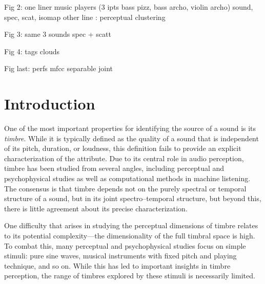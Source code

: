 \documentclass[10pt,letterpaper]{article}
\begin{document}
Fig 2: one liner music players (3 ipts bass pizz, bass archo, violin archo) sound, spec, scat, isomap
other line : perceptual clustering

Fig 3: same 3 sounds spec + scatt

Fig 4: tags clouds

Fig last: perfs mfcc separable joint


\section*{Introduction}
\label{sec:introduction}


One of the most important properties for identifying the source of a sound is its \emph{timbre}.
While it is typically defined as the quality of a sound that is independent of its pitch, duration, or loudness, this definition fails to provide an explicit characterization of the attribute.
Due to its central role in audio perception, timbre has been studied from several angles, including perceptual and psychophysical studies as well as computational methods in machine listening.
The consensus is that timbre depends not on the purely spectral or temporal structure of a sound, but in its joint spectro--temporal structure, but beyond this, there is little agreement about its precise characterization.

One difficulty that arises in studying the perceptual dimensions of timbre relates to its potential complexity---the dimensionality of the full timbral space is high.
To combat this, many perceptual and psychophysical studies focus on simple stimuli: pure sine waves, musical instruments with fixed pitch and playing technique, and so on.
While this has led to important insights in timbre perception, the range of timbres explored by these stimuli is necessarily limited.
\end{document}
